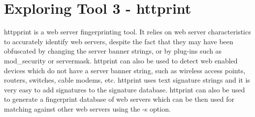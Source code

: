 \documentclass[11pt]{article}
\begin{document}
\section{Exploring Tool 3 - httprint}
httpprint is a web server fingerprinting tool. It relies on web server characteristics to accurately identify web servers, despite the fact that they may have been obfuscated by changing the server banner strings, or by plug-ins such as mod\_security or servermask. httprint can also be used to detect web enabled devices which do not have a server banner string, such as wireless access points, routers, switches, cable modems, etc. httprint uses text signature strings and it is very easy to add signatures to the signature database. httprint can also be used to generate a fingerprint database of web servers which can be then used for matching against other web servers using the -s option.
\end{document}
